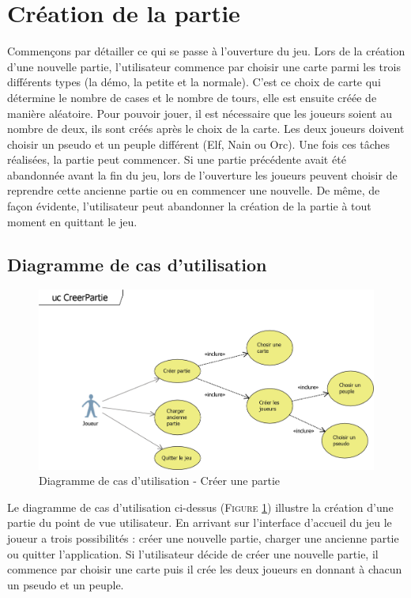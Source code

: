 \documentclass[a4paper,11pt]{article}
\begin{document}
\section{Création de la partie}
	\vspace*{0.5cm}
	Commençons par détailler ce qui se passe à l'ouverture du jeu. Lors de la création d'une nouvelle partie, l'utilisateur commence par choisir une carte parmi les trois différents types (la démo, la petite et la normale). C'est ce choix de carte qui détermine le nombre de cases et le nombre de tours, elle est ensuite créée de manière aléatoire. Pour pouvoir jouer, il est nécessaire que les joueurs soient au nombre de deux, ils sont créés après le choix de la carte. Les deux joueurs doivent choisir un pseudo et un peuple différent (Elf, Nain ou Orc). Une fois ces tâches réalisées, la partie peut commencer. Si une partie précédente avait été abandonnée avant la fin du jeu, lors de l'ouverture les joueurs peuvent choisir de reprendre cette ancienne partie ou en commencer une nouvelle.  De même, de façon évidente, l'utilisateur peut abandonner la création de la partie à tout moment en quittant le jeu. 
	\vspace*{0.5cm}
	
	\subsection{Diagramme de cas d'utilisation}
		\vspace*{0.5cm}
		\begin{figure}[h!]
			\includegraphics{Diagrammes/Creation/ucCreerPartie.png}
			\caption{Diagramme de cas d'utilisation - Créer une partie}
			\label{fig:uccreer}
		\end{figure}
		\vspace*{1cm}
		Le diagramme de cas d'utilisation ci-dessus (\textsc{Figure \ref{fig:uccreer}}) illustre la création d'une partie du point de vue utilisateur. En arrivant sur l'interface d'accueil du jeu le joueur a trois possibilités : créer une nouvelle partie, charger une ancienne partie ou quitter l'application. Si l'utilisateur décide de créer une nouvelle partie, il commence par choisir une carte puis il crée les deux joueurs en donnant à chacun un pseudo et un peuple.
		\newpage
\end{document}
